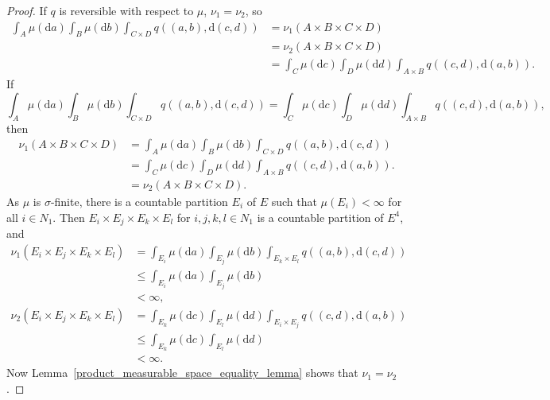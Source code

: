 \documentclass[english,twoside,openright]{HYgraduMLDS}
\newcommand{\dx}{\mathrm{d}}
\begin{document}
\begin{proof}
	If \(q\) is reversible with respect to \(\mu\), \(\nu_{1} = \nu_{2}\), so
  \begin{align*}
    \int_{A}\mu(\dx a)\int_{B}\mu(\dx b)\int_{C\times D}q((a, b), \dx(c, d))
    &= \nu_{1}(A\times B\times C\times D)
    \\&= \nu_{2}(A\times B\times C\times D)
    \\&= \int_{C}\mu(\dx c)\int_{D}\mu(\dx d)\int_{A\times B}q((c, d), \dx(a, b)).
  \end{align*}
  If
  \[
    \int_{A}\mu(\dx a)\int_{B}\mu(\dx b)\int_{C\times D}q((a, b), \dx(c, d))
    = \int_{C}\mu(\dx c)\int_{D}\mu(\dx d)\int_{A\times B}q((c, d), \dx(a, b)),
  \]
  then
  \begin{align*}
    \nu_{1}(A\times B\times C\times D)
    &= \int_{A}\mu(\dx a)\int_{B}\mu(\dx b)\int_{C\times D}q((a, b), \dx(c, d))
    \\&= \int_{C}\mu(\dx c)\int_{D}\mu(\dx d)\int_{A\times B}q((c, d), \dx(a, b)).
    \\&= \nu_{2}(A\times B\times C\times D).
  \end{align*}
  As \(\mu\) is \(\sigma\)-finite, there is a countable partition \(E_{i}\) of \(E\)
  such that \(\mu(E_{i}) < \infty\) for all \(i\in N_{1}\). Then
  \(E_{i}\times E_{j}\times E_{k}\times E_{l}\) for \(i, j, k, l\in N_{1}\) is a
  countable partition of \(E^{4}\), and
  \begin{align*}
    \nu_{1}(E_{i}\times E_{j}\times E_{k}\times E_{l})
    &= \int_{E_{i}}\mu(\dx a)\int_{E_{j}}\mu(\dx b)\int_{E_{k}\times E_{l}}q((a, b), \dx(c,d))
    \\&\leq \int_{E_{i}}\mu(\dx a)\int_{E_{j}}\mu(\dx b)
    \\&< \infty,
  \end{align*}
  \begin{align*}
    \nu_{2}(E_{i}\times E_{j}\times E_{k}\times E_{l})
    &= \int_{E_{k}}\mu(\dx c)\int_{E_{l}}\mu(\dx d)\int_{E_{i}\times E_{j}}q((c, d), \dx(a,b))
    \\&\leq \int_{E_{k}}\mu(\dx c)\int_{E_{l}}\mu(\dx d)
    \\&< \infty.
  \end{align*}
  Now Lemma~\ref{product_measurable_space_equality_lemma} shows that
  \(\nu_{1} = \nu_{2}\).
\end{proof}
\end{document}
